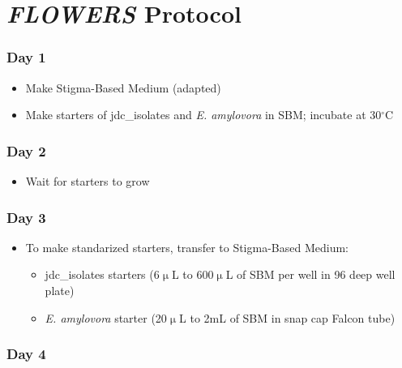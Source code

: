 \documentclass[a4paper,10pt]{article}
\begin{document}
\section*{\textit{FLOWERS} Protocol}

\subsubsection*{Day 1}

\begin{itemize}[label=\Square]

\item Make Stigma-Based Medium (adapted)
\item Make starters of jdc\_isolates and \textit{E. amylovora} in SBM; incubate
at 30$^\circ$C

\end{itemize}

\subsubsection*{Day 2}

\begin{itemize}[label=\Square]

\item Wait for starters to grow

\end{itemize}

\subsubsection*{Day 3}

\begin{itemize}[label=\Square]

\item To make standarized starters, transfer to Stigma-Based Medium:
\begin{itemize}[label=\Square]
\item jdc\_isolates starters (6$\upmu$L to 600$\upmu$L of SBM per well in 96 deep well plate)
\item \textit{E. amylovora} starter (20$\upmu$L to 2mL of SBM in snap cap Falcon tube)
\end{itemize}

\end{itemize}

\subsubsection*{Day 4}
\end{document}
